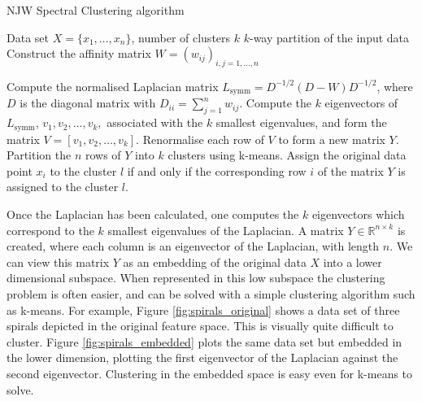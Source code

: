 \begin{algorithm}
\caption{NJW Spectral Clustering algorithm}
\begin{algorithmic}[1]
\REQUIRE Data set $X = \{x_1,\ldots, x_n \}$, number of clusters $k$
\ENSURE $k$-way partition of the input data
\STATE Construct the affinity matrix $W = (w_{ij})_{i,j = 1,\ldots, n}$ %

\STATE Compute the normalised Laplacian matrix  $L_{\text{symm}} = D^{-1/2}( D - W )D^{-1/2}$, where $D$ is the diagonal matrix with $D_{ii}=\sum_{j=1}^{n} w_{ij}.$
\STATE Compute the $k$ eigenvectors of $L_{\text{symm}}$, $v_1, v_2,\ldots , v_k,$ associated with the $k$ smallest eigenvalues, and form the matrix $ V = [v_1,v_2, \ldots ,v_k]$.
\STATE Renormalise each row of $V$ to form a new matrix $Y$.
\STATE Partition the $n$ rows of $Y$ into $k$ clusters using  k-means.
\STATE Assign the original data point $x_i$ to the cluster $l$ if and only if the corresponding row $i$ of the matrix $Y$ is assigned to the cluster $l$.
\end{algorithmic}
\label{alg:njw}
\end{algorithm}

Once the Laplacian has been calculated, one computes the $k$ eigenvectors which correspond to the $k$ smallest eigenvalues of the Laplacian. A matrix $Y \in \mathbb{R}^{n \times k}$ is created, where each column is an eigenvector of the Laplacian, with length $n$. We can view this matrix $Y$ as an embedding of the original data $X$ into a lower dimensional subspace. When represented in this low subspace the clustering problem is often easier, and can be solved with a simple clustering algorithm such as k-means. For example, Figure \ref{fig:spirals_original} shows a data set of three spirals depicted in the original feature space. This is visually quite difficult to cluster. Figure \ref{fig:spirals_embedded} plots the same data set but embedded in the lower dimension, plotting the first eigenvector of the Laplacian against the second eigenvector. Clustering in the embedded space is easy even for k-means to solve. 


